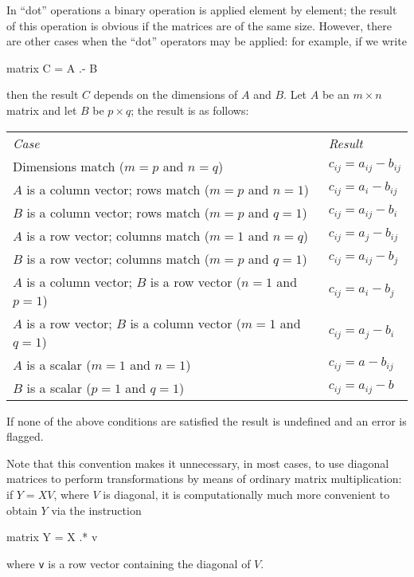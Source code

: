 In ``dot'' operations a binary operation is applied element by
element; the result of this operation is obvious if the matrices are
of the same size. However, there are other cases when the ``dot''
operators may be applied: for example, if we write
%
\begin{code}
matrix C = A .- B
\end{code}
% 
then the result $C$ depends on the dimensions of $A$ and $B$.  Let $A$
be an $m \times n$ matrix and let $B$ be $p \times q$; the result is
as follows:
\begin{center}
  \begin{tabular}{p{}l}
    \textit{Case} & \textit{Result} \\[4pt]
    Dimensions match ($m=p$ and $n=q$) & 
    $c_{ij} = a_{ij} -  b_{ij}$ \\ 
    $A$ is a column vector; rows match ($m=p$ and $n=1$) &
    $c_{ij} = a_{i} - b_{ij}$ \\ 
    $B$ is a column vector; rows match ($m=p$ and $q=1$) &
    $c_{ij} = a_{ij} - b_{i}$ \\ 
    $A$ is a row vector; columns match ($m=1$ and $n=q$) &
    $c_{ij} = a_{j} - b_{ij}$ \\ 
    $B$ is a row vector; columns match ($m=p$ and $q=1$) &
    $c_{ij} = a_{ij} - b_{j}$ \\ 
    $A$ is a column vector; $B$ is a row vector ($n=1$ and $p=1$) &
    $c_{ij} = a_{i} - b_{j}$ \\ 
    $A$ is a row vector; $B$ is a column vector ($m=1$ and $q=1$) &
    $c_{ij} = a_{j} - b_{i}$ \\ 
    $A$ is a scalar ($m=1$ and $n=1$) &
    $c_{ij} = a - b_{ij}$ \\ 
    $B$ is a scalar ($p=1$ and $q=1$) &
    $c_{ij} = a_{ij} - b$ \\ 
  \end{tabular}
\end{center}
%
If none of the above conditions are satisfied the result is undefined
and an error is flagged.

Note that this convention makes it unnecessary, in most cases, to use
diagonal matrices to perform transformations by means of ordinary
matrix multiplication: if $Y = XV$, where $V$ is diagonal, it is
computationally much more convenient to obtain $Y$ via the instruction
%
\begin{code}
matrix Y = X .* v
\end{code}
%
where \texttt{v} is a row vector containing the diagonal of $V$.

